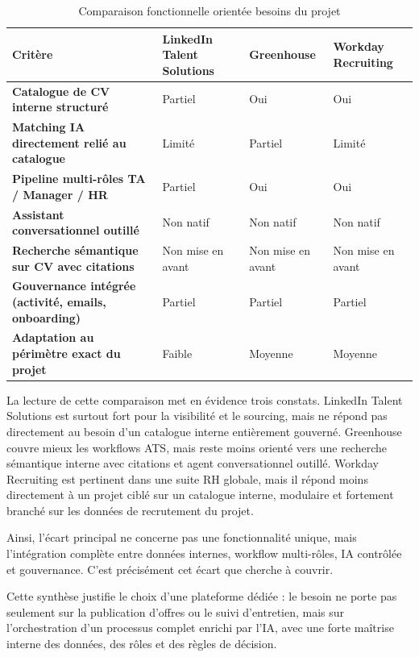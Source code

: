 \begin{table}[H]
  \centering
  \caption{\label{tab:existing-solutions-comparison}Comparaison fonctionnelle orientée besoins du projet}
  \begin{tabularx}{\textwidth}{>{\bfseries}p{4.2cm}XXX}
    \toprule
    Critère & LinkedIn Talent Solutions & Greenhouse & Workday Recruiting \\
    \midrule
    Catalogue de CV interne structuré & Partiel & Oui & Oui \\
    Matching IA directement relié au catalogue & Limité & Partiel & Limité \\
    Pipeline multi-rôles TA / Manager / HR & Partiel & Oui & Oui \\
    Assistant conversationnel outillé & Non natif & Non natif & Non natif \\
    Recherche sémantique sur CV avec citations & Non mise en avant & Non mise en avant & Non mise en avant \\
    Gouvernance intégrée (activité, emails, onboarding) & Partiel & Partiel & Partiel \\
    Adaptation au périmètre exact du projet & Faible & Moyenne & Moyenne \\
    \bottomrule
  \end{tabularx}
\end{table}
La lecture de cette comparaison met en évidence trois constats. LinkedIn Talent Solutions est surtout fort pour la visibilité et le sourcing, mais ne répond pas directement au besoin d'un catalogue interne entièrement gouverné. Greenhouse couvre mieux les workflows ATS, mais reste moins orienté vers une recherche sémantique interne avec citations et agent conversationnel outillé. Workday Recruiting est pertinent dans une suite RH globale, mais il répond moins directement à un projet ciblé sur un catalogue interne, modulaire et fortement branché sur les données de recrutement du projet.

Ainsi, l'écart principal ne concerne pas une fonctionnalité unique, mais l'intégration complète entre données internes, workflow multi-rôles, IA contrôlée et gouvernance. C'est précisément cet écart que \projectname{} cherche à couvrir.

Cette synthèse justifie le choix d'une plateforme dédiée : le besoin ne porte pas seulement sur la publication d'offres ou le suivi d'entretien, mais sur l'orchestration d'un processus complet enrichi par l'IA, avec une forte maîtrise interne des données, des rôles et des règles de décision.

